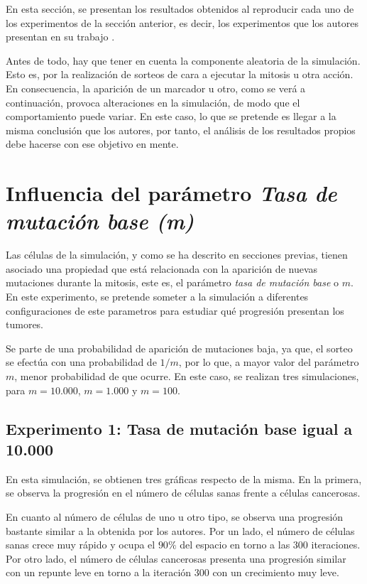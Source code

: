 En esta sección, se presentan los resultados obtenidos al reproducir cada uno de
los experimentos de la sección anterior, es decir, los experimentos que los autores
presentan en su trabajo \cite{jsantos-amonteagudo-1-2014}.

Antes de todo, hay que tener en cuenta la componente aleatoria de la simulación. Esto es, por
la realización de sorteos de cara a ejecutar la mitosis u otra acción. En consecuencia, la aparición
de un marcador u otro, como se verá a continuación, provoca alteraciones en la simulación, de modo que
el comportamiento puede variar. En este caso, lo que se pretende es llegar a la misma conclusión que los autores,
por tanto, el análisis de los resultados propios debe hacerse con ese objetivo en mente.

\section{Influencia del parámetro \textit{Tasa de mutación base (m)}}

Las células de la simulación, y como se ha descrito en secciones previas, tienen asociado una propiedad que está relacionada con la aparición
de nuevas mutaciones durante la mitosis, este es, el parámetro \textit{tasa de mutación base} o $m$. En este experimento,
se pretende someter a la simulación a diferentes configuraciones de este parametros para estudiar qué
progresión presentan los tumores.

Se parte de una probabilidad de aparición de mutaciones baja, ya que, el sorteo se efectúa con una probabilidad de
$1/m$, por lo que, a mayor valor del parámetro $m$, menor probabilidad de que ocurre. En este caso, se
realizan tres simulaciones, para $m=10.000$, $m=1.000$ y $m=100$.

\subsection{Experimento 1: Tasa de mutación base igual a 10.000}

En esta simulación, se obtienen tres gráficas respecto de la misma. En la primera, se observa la progresión
en el número de células sanas frente a células cancerosas.

En cuanto al número de células de uno u otro tipo, se observa una progresión bastante similar a la obtenida por los autores.
Por un lado, el número de células sanas crece muy rápido y ocupa el $90\%$ del espacio en torno a las $300$ iteraciones. Por otro lado,
el número de células cancerosas presenta una progresión similar con un repunte leve en torno a la iteración $300$ con un crecimiento muy leve.

